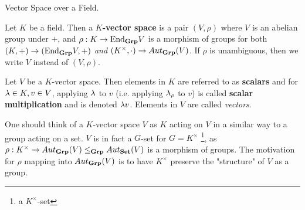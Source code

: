 \documentclass[../../book.tex]{subfiles}
\begin{document}
\begin{dfn} Vector Space over a Field. 

    Let $K$ be a field. 
    Then a \textbf{$K$-vector space} is a pair $(V,\rho)$
    where $V$ is an abelian group under $+$, 
    and $\rho : K \to \mathrm{End}_{\mathbf{Grp}}V$ is a morphism of groups for both
    $(K,+) \to (\mathrm{End}_{\mathbf{Grp}}V,+)$ \emph{and} 
    $(K^\times,\cdot) \to Aut_{\mathbf{Grp}}(V)$.
    If $\rho$ is unambiguous, then we write $V$ instead of $(V,\rho)$. 
    
    Let $V$ be a $K$-vector space. 
    Then elements in $K$ are referred to as \textbf{scalars}
    and for $\lambda \in K, v \in V$, applying $\lambda$ to $v$ 
    (i.e. applying $\lambda_\rho$ to $v$) is called
    \textbf{scalar multiplication} and is denoted $\lambda v$. 
    Elements in $V$ are called \emph{vectors}. 

\end{dfn}

\begin{rmk}
    One should think of a $K$-vector space $V$ as $K$ acting on $V$
    in a similar way to a group acting on a set. 
    $V$ is in fact a $G$-set for $G=K^\times$
    \footnote{a $K^\times$-set}, 
    as $\rho : K^\times \to Aut_{\mathbf{Grp}}(V) \leq_{\mathbf{Grp}} Aut_{\mathbf{Set}}(V)$
    is a morphism of groups. 
    The motivation for $\rho$ mapping into $Aut_{\mathbf{Grp}}(V)$ is
    to have $K^\times$ preserve the "structure" of $V$ as a group. 
    
\end{rmk}

\end{document}
